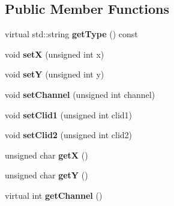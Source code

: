 \subsection*{Public Member Functions}
\begin{DoxyCompactItemize}
\item 
virtual std\+::string {\bfseries get\+Type} () const \hypertarget{classev_1_1CollisionEvent_a8c3294310e3f51afbea28abab00b8e3b}{}\label{classev_1_1CollisionEvent_a8c3294310e3f51afbea28abab00b8e3b}

\item 
void {\bfseries setX} (unsigned int x)\hypertarget{classev_1_1CollisionEvent_a3921f015acddf510b6a317a0b10e9f15}{}\label{classev_1_1CollisionEvent_a3921f015acddf510b6a317a0b10e9f15}

\item 
void {\bfseries setY} (unsigned int y)\hypertarget{classev_1_1CollisionEvent_aa9dc1d6e5b9aa67a0b7b502913cee89b}{}\label{classev_1_1CollisionEvent_aa9dc1d6e5b9aa67a0b7b502913cee89b}

\item 
void {\bfseries set\+Channel} (unsigned int channel)\hypertarget{classev_1_1CollisionEvent_abb4121aa9f67570c6ac93289aad7279b}{}\label{classev_1_1CollisionEvent_abb4121aa9f67570c6ac93289aad7279b}

\item 
void {\bfseries set\+Clid1} (unsigned int clid1)\hypertarget{classev_1_1CollisionEvent_a341cee724f0d5a9992454ee1ac1cdd49}{}\label{classev_1_1CollisionEvent_a341cee724f0d5a9992454ee1ac1cdd49}

\item 
void {\bfseries set\+Clid2} (unsigned int clid2)\hypertarget{classev_1_1CollisionEvent_a5b081b2e35cdc3c30f65479c9e5718ee}{}\label{classev_1_1CollisionEvent_a5b081b2e35cdc3c30f65479c9e5718ee}

\item 
unsigned char {\bfseries getX} ()\hypertarget{classev_1_1CollisionEvent_aa20ffbfb15877d44765138595fed0c45}{}\label{classev_1_1CollisionEvent_aa20ffbfb15877d44765138595fed0c45}

\item 
unsigned char {\bfseries getY} ()\hypertarget{classev_1_1CollisionEvent_a08a6c9661d7e2e67b374705c36e086d7}{}\label{classev_1_1CollisionEvent_a08a6c9661d7e2e67b374705c36e086d7}

\item 
virtual int {\bfseries get\+Channel} ()\hypertarget{classev_1_1CollisionEvent_af70a6531452ad00760d46c223a34adf8}{}\label{classev_1_1CollisionEvent_af70a6531452ad00760d46c223a34adf8}


\end{DoxyCompactItemize}
